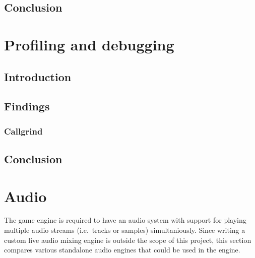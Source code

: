 \documentclass{projdoc}
\begin{document}
\subsection{Conclusion}

\section{Profiling and debugging}



\subsection{Introduction}

\subsection{Findings}

\subsubsection{Callgrind}

\begin{comparison}
\end{comparison}

\subsection{Conclusion}

\section{Audio}


The game engine is required to have an audio system with support for playing multiple
audio streams (i.e.~tracks or samples) simultaniously. Since writing a custom live
audio mixing engine is outside the scope of this project, this section compares
various standalone audio engines that could be used in the engine.
\end{document}
